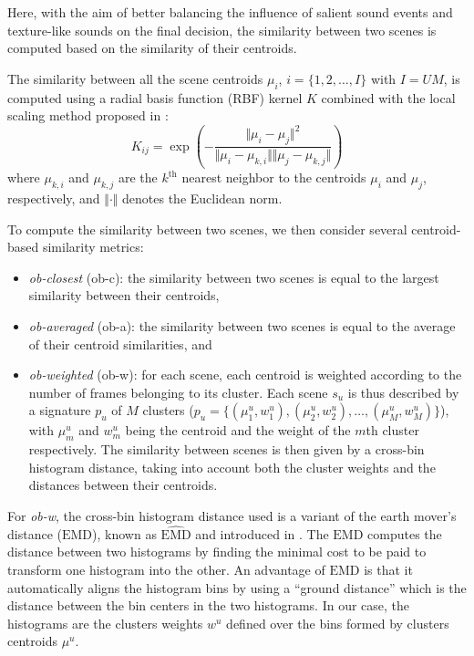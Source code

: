 \documentclass[journal]{IEEEtran}
\newcommand*{\EMD}{\mathrm{EMD}}
\newcommand{\ja}[1]{\textcolor{magenta}{Joakim : #1}}
\begin{document}

Here, with the aim of better balancing the influence of salient sound events and texture-like sounds on the final decision, the similarity between two scenes is computed based on the similarity of their centroids.

The similarity between all the scene centroids $\mu_i$, $i=\lbrace1,2,\ldots,I \rbrace$ with $I=UM$, is computed using a radial basis function (RBF) kernel $K$ combined with the local scaling method proposed in \cite{selfTuneManor2004}:
\begin{equation}
\label{eq:kc}
K_{ij} = \exp\left( - \dfrac{\Vert \mu_i - \mu_j \Vert^2}{\Vert \mu_i - \mu_{k,i} \Vert \Vert \mu_j - \mu_{k,j} \Vert} \right) 
\end{equation} 
where $\mu_{k,i}$ and $\mu_{k,j}$ are the $k^{\textrm{th}}$ nearest neighbor to the centroids $\mu_i$ and $\mu_j$, respectively, and $\Vert \cdot \Vert$ denotes the Euclidean norm.

To compute the similarity between two scenes, we then consider several centroid-based similarity metrics:
\begin{itemize}
\item \emph{ob-closest} (ob-c): the similarity between two scenes is equal to the largest similarity between their centroids,
\item \emph{ob-averaged} (ob-a): the similarity between two scenes is equal to the average of their centroid similarities, and
\item \emph{ob-weighted} (ob-w): for each scene, each centroid is weighted according to the number of frames belonging to its cluster. Each scene $s_u$ is thus described by a signature $p_u$ of $M$ clusters ($p_u=\lbrace(\mu_1^u,w_1^u),(\mu_2^u,w_2^u),\ldots,(\mu_M^u,w_M^u)\rbrace$), with $\mu_m^u$ and $w_m^u$ being the centroid and the weight of the $m$th cluster respectively. The similarity between scenes is then given by a cross-bin histogram distance, taking into account both the cluster weights and the distances between their centroids.
\end{itemize}

For \emph{ob-w}, the cross-bin histogram distance used is a variant of the earth mover's distance ($\EMD$), known as $\widehat{\EMD}$ and introduced in \cite{pele2008linear}. The $\EMD$ computes the distance between two histograms by finding the minimal cost to be paid to transform one histogram into the other. An advantage of $\EMD$ is that it automatically aligns the histogram bins by using a ``ground distance'' which is the distance between the bin centers in the two histograms. In our case, the histograms are the clusters weights $w^u$ defined over the bins formed by clusters centroids $\mu^u$.
\end{document}

